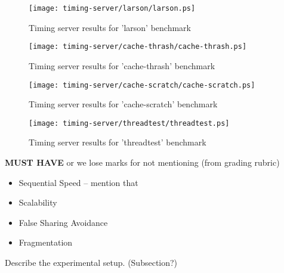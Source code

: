 \documentclass{article}
\begin{document}
\begin{figure}[h]
    \centering
    \texttt{[image: timing-server/larson/larson.ps]}
    \caption{Timing server results for 'larson' benchmark}
    \label{fig:t-larson}
\end{figure}

\begin{figure}[h]
    \centering
    \texttt{[image: timing-server/cache-thrash/cache-thrash.ps]}
    \caption{Timing server results for 'cache-thrash' benchmark}
    \label{fig:t-cache-thrash}
\end{figure}

\begin{figure}[h]
    \centering
    \texttt{[image: timing-server/cache-scratch/cache-scratch.ps]}
    \caption{Timing server results for 'cache-scratch' benchmark}
    \label{fig:t-cache-scratch}
\end{figure}

\begin{figure}[h]
    \centering
    \texttt{[image: timing-server/threadtest/threadtest.ps]}
    \caption{Timing server results for 'threadtest' benchmark}
    \label{fig:t-threadtest}
\end{figure}

\textbf{MUST HAVE} or we lose marks for not mentioning (from grading rubric)
\begin{itemize}
	\item Sequential Speed -- mention that
	\item Scalability
	\item False Sharing Avoidance
	\item Fragmentation
\end{itemize}

Describe the experimental setup. (Subsection?)
\end{document}

